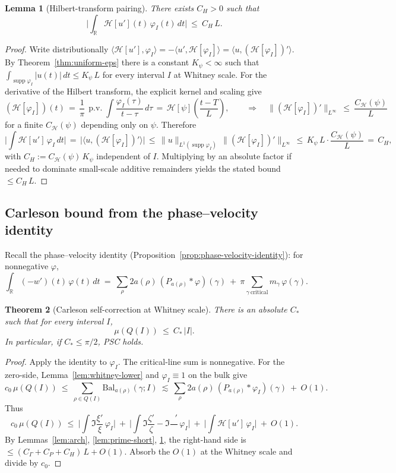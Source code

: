 \documentclass[11pt]{article}
\newtheorem{theorem}{Theorem}
\newtheorem{lemma}[theorem]{Lemma}
\theoremstyle{definition}
\theoremstyle{remark}
\newcommand{\R}{\mathbb{R}}
\DeclareMathOperator{\dettwo}{det_2}
\begin{document}
\begin{lemma}[Hilbert-transform pairing]\label{lem:hilbert}
There exists \(C_H>0\) such that
\[ \Big|\int_{\R} \mathcal H[u'](t)\,\varphi_I(t)\,dt\Big|\ \le\ C_H\,L.\]
\end{lemma}
\begin{proof}
Write distributionally \(\langle \mathcal H[u'],\varphi_I\rangle=-\langle u',\mathcal H[\varphi_I]\rangle=\langle u,(\mathcal H[\varphi_I])'\rangle\). By Theorem~\ref{thm:uniform-eps} there is a constant \(K_\psi<\infty\) such that \(\int_{\operatorname{supp}\varphi_I}|u(t)|\,dt\le K_\psi\,L\) for every interval \(I\) at Whitney scale. For the derivative of the Hilbert transform, the explicit kernel and scaling give
\[
  (\mathcal H[\varphi_I])(t)
   \,=\, \frac{1}{\pi}\,\operatorname{p.v.}\!\int \frac{\varphi_I(\tau)}{t-\tau}\,d\tau
   \,=\, \mathcal H[\psi]\!\left(\frac{t-T}{L}\right),\qquad
  \Rightarrow\quad \|(\mathcal H[\varphi_I])'\|_{L^\infty}\ \le\ \frac{C_{\mathcal H}(\psi)}{L}
\]
for a finite \(C_{\mathcal H}(\psi)\) depending only on \(\psi\). Therefore
\[
  \Big|\int \mathcal H[u']\,\varphi_I\,dt\Big|
    \,=\, \big|\langle u,(\mathcal H[\varphi_I])'\rangle\big|
    \,\le\, \|u\|_{L^1(\operatorname{supp}\varphi_I)}\,\|(\mathcal H[\varphi_I])'\|_{L^\infty}
    \,\le\, K_\psi\,L\cdot \frac{C_{\mathcal H}(\psi)}{L}
    \,=\, C_H,
\]
with \(C_H:=C_{\mathcal H}(\psi)\,K_\psi\) independent of \(I\). Multiplying by an absolute factor if needed to dominate small-scale additive remainders yields the stated bound \(\le C_H\,L\).
\end{proof}

\subsection{Carleson bound from the phase--velocity identity}
Recall the phase--velocity identity (Proposition~\ref{prop:phase-velocity-identity}): for nonnegative \(\varphi\),
\[ \int_{\R}(-w')(t)\,\varphi(t)\,dt\ =\ \sum_{\rho}2a(\rho)\,(P_{a(\rho)}*\varphi)(\gamma)\ +\ \pi\sum_{\gamma\ \mathrm{critical}} m_\gamma\,\varphi(\gamma).\]

\begin{theorem}[Carleson self-correction at Whitney scale]\label{thm:psc-unconditional}
There is an absolute \(C_*\) such that for every interval \(I\),
\[ \mu(Q(I))\ \le\ C_*\,|I|. \]
In particular, if \(C_*\le \pi/2\), PSC holds.
\end{theorem}
\begin{proof}
Apply the identity to \(\varphi_I\). The critical-line sum is nonnegative. For the zero-side, Lemma~\ref{lem:whitney-lower} and \(\varphi_I\equiv 1\) on the bulk give
\[ c_0\,\mu(Q(I))\ \le\ \sum_{\rho\in Q(I)} \mathrm{Bal}_{a(\rho)}(\gamma;I)\ \lesssim\ \sum_{\rho}2a(\rho)\,(P_{a(\rho)}*\varphi_I)(\gamma)\ +\ O(1). \]
Thus
\[ c_0\,\mu(Q(I))\ \le\ \Big|\int \Im\frac{\xi'}{\xi}\,\varphi_I\Big|\ +\ \Big|\int \Im\frac{\zeta'}{\zeta}-\Im\frac{\dettwo'}{\dettwo}\,\varphi_I\Big|\ +\ \Big|\int \mathcal H[u']\,\varphi_I\Big|\ +\ O(1). \]
By Lemmas~\ref{lem:arch}, \ref{lem:prime-short}, \ref{lem:hilbert}, the right-hand side is \(\le (C_\Gamma+C_P+C_H)\,L+O(1)\). Absorb the \(O(1)\) at the Whitney scale and divide by \(c_0\).
\end{proof}
\end{document}
